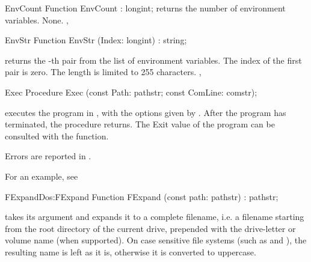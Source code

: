

\begin{function}{EnvCount}
\Declaration
Function EnvCount  : longint;\Description
{} returns the number of environment variables.
\Errors
None.
\SeeAlso
{}, 
\end{function}

\begin{function}{EnvStr}
\Declaration
Function EnvStr (Index: longint) : string;\Description

 returns the -th  pair from the list
of environment variables. 
The index of the first pair is zero.
\Errors
The length is limited to 255 characters. 
\SeeAlso
{}, 
\end{function}


\begin{procedure}{Exec}
\Declaration
Procedure Exec (const Path: pathstr; const ComLine: comstr);
\Description

 executes the program in , with the options given by
.
After the program has terminated, the procedure returns. The Exit value of
the program can be consulted with the  function.

\Errors
Errors are reported in .
\SeeAlso
{}
\end{procedure}
For an example, see 
\begin{functionl}{FExpand}{Dos:FExpand}
\Declaration
Function FExpand (const path: pathstr) : pathstr;
\Description

 takes its argument and expands it to a complete filename, i.e.
a filename starting from the root directory of the current drive, prepended
with the drive-letter or volume name (when supported).
\Portability
On case sensitive file systems (such as \unix and \linux), the resulting
name is left as it is, otherwise it is converted to uppercase.
\Errors
{}
\SeeAlso
\end{functionl}


